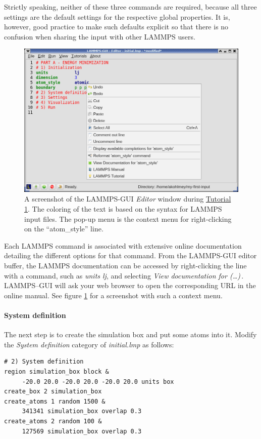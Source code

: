 \documentclass[9pt,tutorial]{livecoms}
\begin{document}
Strictly speaking, neither of these three commands are required, because
all three settings are the default settings for the respective global
properties.  It is, however, good practice to make such defaults
explicit so that there is no confusion when sharing the input with other
LAMMPS users.

\begin{figure}
\centering
\includegraphics[width=0.75\linewidth]{GUI-1.png}
\caption{A screenshot of the LAMMPS-GUI \textit{Editor} window during
  \hyperref[lennard-jones-label]{Tutorial 1}. The coloring of the text
  is based on the syntax for LAMMPS input files.  The pop-up menu is the
  context menu for right-clicking on the ``atom\_style'' line.}
\label{fig:GUI-1}
\end{figure}

Each LAMMPS command is associated with extensive online documentation
detailing the different options for that command.  From the LAMMPS-GUI
editor buffer, the LAMMPS documentation can be accessed by
right-clicking the line with a command, such as \textit{units lj}, and
selecting \textit{View documentation for (\dots)}\,.  LAMMPS--GUI will
ask your web browser to open the corresponding URL in the online manual.
See figure \ref{fig:GUI-1} for a screenshot with such a context menu.

\paragraph{System definition}

The next step is to create the simulation box and put some atoms into it.
Modify the \textit{System definition} category of \textit{initial.lmp} as follows:
{\normalsize
\begin{verbatim}
# 2) System definition
region simulation_box block &
     -20.0 20.0 -20.0 20.0 -20.0 20.0 units box
create_box 2 simulation_box
create_atoms 1 random 1500 &
     341341 simulation_box overlap 0.3
create_atoms 2 random 100 &
     127569 simulation_box overlap 0.3
\end{verbatim}
}
\end{document}
